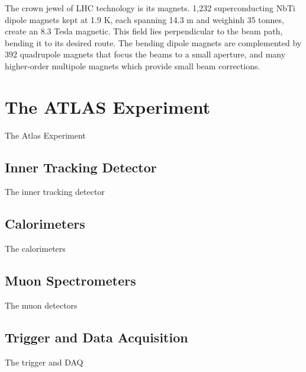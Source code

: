 The crown jewel of LHC technology is its magnets. 1,232 superconducting NbTi dipole magnets kept at 1.9 K, each spanning 14.3 m and weighinh 35 tonnes, create an 8.3 Tesla magnetic. This field lies perpendicular to the beam path, bending it to its desired route. The bending dipole magnets are complemented by 392 quadrupole magnets that focus the beams to a small aperture, and many higher-order multipole magnets which provide small beam corrections.



\section{The ATLAS Experiment}
\label{section:atlas}
The Atlas Experiment
\subsection{Inner Tracking Detector}
The inner tracking detector
\subsection{Calorimeters}
The calorimeters
\subsection{Muon Spectrometers}
The muon detectors
\subsection{Trigger and Data Acquisition}
The trigger and DAQ

% 
